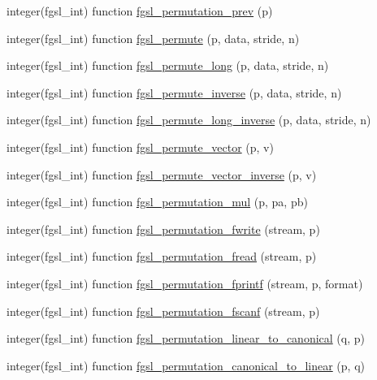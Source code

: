 \begin{DoxyCompactItemize}
\item 
integer(fgsl\-\_\-int) function \hyperlink{permutation_8finc_ad79479a9b29165694fac758d0273dd3b}{fgsl\-\_\-permutation\-\_\-prev} (p)
\item 
integer(fgsl\-\_\-int) function \hyperlink{permutation_8finc_a64ded2ffe57374e81cc24d8ad04b6148}{fgsl\-\_\-permute} (p, data, stride, n)
\item 
integer(fgsl\-\_\-int) function \hyperlink{permutation_8finc_ae71ea0ea188f81ca85fe057156e3d640}{fgsl\-\_\-permute\-\_\-long} (p, data, stride, n)
\item 
integer(fgsl\-\_\-int) function \hyperlink{permutation_8finc_acd5ee6d013add3c9e7d1eb17894f5052}{fgsl\-\_\-permute\-\_\-inverse} (p, data, stride, n)
\item 
integer(fgsl\-\_\-int) function \hyperlink{permutation_8finc_ad2e7ff6db70fadebed473132caea4d0a}{fgsl\-\_\-permute\-\_\-long\-\_\-inverse} (p, data, stride, n)
\item 
integer(fgsl\-\_\-int) function \hyperlink{permutation_8finc_ab81bbdcef327e226cd027f97e0a05a95}{fgsl\-\_\-permute\-\_\-vector} (p, v)
\item 
integer(fgsl\-\_\-int) function \hyperlink{permutation_8finc_a2549c3a5bd772265ce9000cfaa6450dc}{fgsl\-\_\-permute\-\_\-vector\-\_\-inverse} (p, v)
\item 
integer(fgsl\-\_\-int) function \hyperlink{permutation_8finc_ab7b90e7b838d166f4522534e3fdb4892}{fgsl\-\_\-permutation\-\_\-mul} (p, pa, pb)
\item 
integer(fgsl\-\_\-int) function \hyperlink{permutation_8finc_ad5f09fa0443ced857bf3707d63e722ca}{fgsl\-\_\-permutation\-\_\-fwrite} (stream, p)
\item 
integer(fgsl\-\_\-int) function \hyperlink{permutation_8finc_a12d2a8bdd550b927c26430cfe7a1f8a3}{fgsl\-\_\-permutation\-\_\-fread} (stream, p)
\item 
integer(fgsl\-\_\-int) function \hyperlink{permutation_8finc_adcb7bf1d2df5b5a5c929c8c2d2c226f6}{fgsl\-\_\-permutation\-\_\-fprintf} (stream, p, format)
\item 
integer(fgsl\-\_\-int) function \hyperlink{permutation_8finc_aa083e7f38a4e3a1d52c65cff84c58427}{fgsl\-\_\-permutation\-\_\-fscanf} (stream, p)
\item 
integer(fgsl\-\_\-int) function \hyperlink{permutation_8finc_ad78bb0a655c528b6119c36e27e4ba80e}{fgsl\-\_\-permutation\-\_\-linear\-\_\-to\-\_\-canonical} (q, p)
\item 
integer(fgsl\-\_\-int) function \hyperlink{permutation_8finc_adf466e8130262699f0fc3c537628cd69}{fgsl\-\_\-permutation\-\_\-canonical\-\_\-to\-\_\-linear} (p, q)

\end{DoxyCompactItemize}
